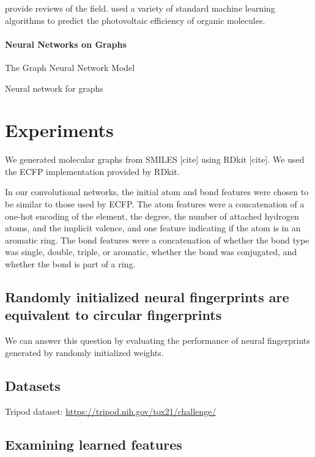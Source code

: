 \documentclass{article}
\begin{document}
\cite{Eckert2007225, bergeron2011modeling} provide reviews of the field.
\cite{tingley2014towards} used a variety of standard machine learning algorithms to predict the photovoltaic efficiency of organic molecules.

\paragraph{Neural Networks on Graphs}

\cite{graphnn2009} The Graph Neural Network Model

\cite{micheli2009neural} Neural network for graphs



\section{Experiments}

We generated molecular graphs from SMILES [cite] using RDkit [cite].
We used the ECFP implementation provided by RDkit.

In our convolutional networks, the initial atom and bond features were chosen to be similar to those used by ECFP.
The atom features were a concatenation of a one-hot encoding of the element, the degree, the number of attached hydrogen atoms, and the implicit valence, and one feature indicating if the atom is in an aromatic ring. 
The bond features were a concatenation of whether the bond type was single, double, triple, or aromatic, whether the bond was conjugated, and whether the bond is part of a ring.

\subsection{Randomly initialized neural fingerprints are equivalent to circular fingerprints}
\label{sec:random is equivalent}

We can answer this question by evaluating the performance of neural fingerprints generated by randomly initialized weights.


\subsection{Datasets}

Tripod dataset: \url{https://tripod.nih.gov/tox21/challenge/}
\cite{unterthiner2015toxicity}



\subsection{Examining learned features}
\end{document}
